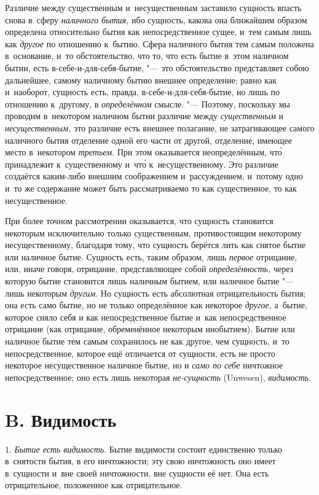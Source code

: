 Различие между существенным и~несущественным заставило сущность впасть снова
в~сферу {\em наличного бытия,} ибо сущность, какова она
ближайшим образом определена относительно бытия как непосредственное сущее,
и~тем самым лишь как {\em другое} по отношению к~бытию.
Сфера наличного бытия тем самым положена в~основание, и~то обстоятельство,
что то, что есть бытие в~этом наличном бытии, есть в-себе-и-для-себя-бытие,
"--- это обстоятельство представляет собою дальнейшее, самому наличному бытию
внешнее определение; равно как и~наоборот, сущность есть, правда,
в-себе-и-для-себя-бытие, но лишь по отношению к~другому, в
{\em определённом} смысле. "--- Поэтому, поскольку мы
проводим в~некотором наличном бытии различие между
{\em существенным} и
{\em несущественным,} это различие есть внешнее
полагание, не затрагивающее самого наличного бытия отделение одной его
части от другой, отделение, имеющее место в~некотором
{\em третьем}. При этом оказывается неопределённым, чт\'{о} принадлежит
к~существенному и~чт\'{о} к~несущественному. Это различие создаётся
каким-либо внешним соображением и~рассуждением, и~потому одно и~то же
содержание может быть рассматриваемо то как существенное, то как
несущественное.

При более точном рассмотрении оказывается, что сущность становится некоторым
исключительно только существенным, противостоящим некоторому
несущественному, благодаря тому, что сущность берётся лить как снятое бытие
или наличное бытие. Сущность есть, таким образом, лишь
{\em первое} отрицание, или, иначе говоря, отрицание,
представляющее собой {\em определённость,} через
которую бытие становится лишь наличным бытием, или наличное бытие "--- лишь
некоторым {\em другим}. Но сущность есть абсолютная
отрицательность бытия; она есть само бытие, но не только определённое как
некоторое {\em другое,} а~бытие, которое сняло себя и
как непосредственное бытие и~как непосредственное отрицание (как отрицание,
обременённое некоторым инобытием). Бытие или наличное бытие тем самым
сохранилось не как другое, чем сущность, и~то непосредственное, которое ещё
отличается от сущности, есть не просто некоторое несущественное наличное
бытие, но и {\em само по себе} ничтожное
непосредственное; оно есть лишь некоторая
{\em не-сущность} (Unwesen),
{\em видимость}.

\section[B. Видимость]{B. Видимость}
1. {\em Бытие есть
видимость}. Бытие видимости состоит единственно только в~снятости бытия, в
его ничтожности; эту свою ничтожность оно имеет в~сущности и~вне своей
ничтожности, вне сущности её нет. Она есть отрицательное, положенное как
отрицательное.

